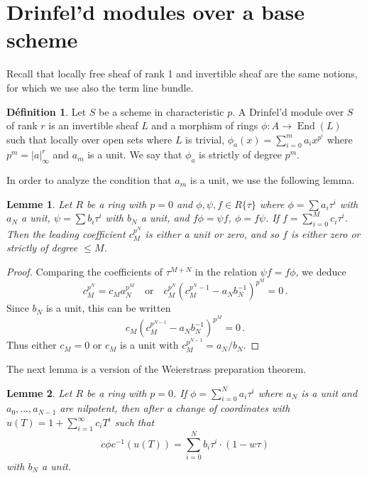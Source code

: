 \documentclass[12pt,a4paper]{article}
\theoremstyle{plain}
\newtheorem{lemma}{Lemme}[section]
\theoremstyle{definition}
\newtheorem{definition}{D\'efinition}[section]
\theoremstyle{remark}
\DeclareMathOperator{\End}{End}
\begin{document}
\section{Drinfel'd modules over a base scheme}

Recall that locally free sheaf of rank 1 and invertible sheaf are the same 
notions, for which we use also the term line bundle.

\begin{definition}
Let $S$ be a scheme in characteristic $p$. A Drinfel'd module over $S$ of 
rank $r$ is an invertible sheaf $L$ and a morphism of rings 
$\phi\colon A \to \End(L)$ such that locally over open sets where $L$ is 
trivial, $\phi_a(x) = \sum_{i=0}^m a_i x^{p^i}$ where $p^m = |a|_\infty^r$ and 
$a_m$ is a unit. We say that $\phi_a$ is strictly of degree $p^m$.
\end{definition}

In order to analyze the condition that $a_m$ is a unit, we use the following 
lemma.

\begin{lemma}
Let $R$ be a ring with $p = 0$ and $\phi, \psi, f \in R\{\tau\}$ where 
$\phi = \sum a_i \tau^i$ with $a_N$ a unit, $\psi = \sum b_i \tau^i$ with $b_N$ 
a unit, and $f\phi = \psi f$, $\phi = f \psi$. If $f = \sum_{i=0}^M c_i \tau^i$. 
Then the leading coefficient $c_M^{p^N}$ is either a unit or zero, and so $f$ 
is either zero or strictly of degree $\leqslant M$.
\end{lemma}

\begin{proof}
Comparing the coefficients of $\tau^{M+N}$ in the relation 
$\psi f = f \phi$, we deduce
\[
c_M^{p^N} = c_M a_N^{p^M} \quad\text{or}\quad c_M^{p^N}(c_M^{p^N-1} - a_N b_N^{-1})^{p^M} = 0 \,.
\]
Since $b_N$ is a unit, this can be written
\[
c_M(c_M^{p^{N-1}} - a_N b_N^{-1})^{p^M} = 0 \,.
\]
Thus either $c_M = 0$ or $c_M$ is a unit with $c_M^{p^{N-1}} = a_N/b_N$.
\end{proof}

The next lemma is a version of the Weierstrass preparation theorem.

\begin{lemma}
Let $R$ be a ring with $p = 0$. If $\phi = \sum_{i=0}^N a_i \tau^i$ where $a_N$ 
is a unit and $a_0, \ldots, a_{N-1}$ are nilpotent, then after a change of 
coordinates with $u(T) = 1 + \sum_{i=1}^\infty c_i T^i$ such that
\[
c\phi c^{-1}(u(T)) = \sum_{i=0}^N b_i \tau^i \cdot (1 - w\tau)
\]
with $b_N$ a unit.
\end{lemma}
\end{document}

